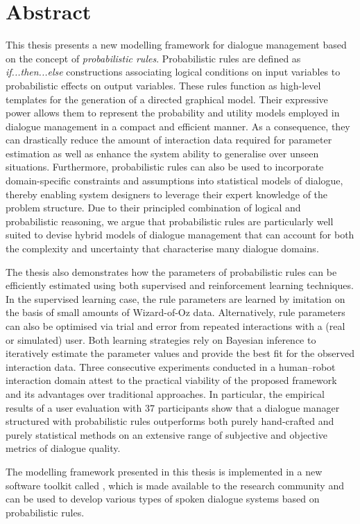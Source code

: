 \chapter*{Abstract}

This thesis presents a new modelling framework for dialogue management based on the concept of \textit{probabilistic rules}.  Probabilistic rules are defined as \textit{if...then...else} constructions associating logical conditions on input variables to probabilistic effects on output variables.  These rules function as high-level templates for the generation of a directed graphical model. Their expressive power allows them to represent the probability and utility models employed in dialogue management in a compact and efficient manner. As a consequence, they can drastically reduce the amount of interaction data required for parameter estimation as well as enhance the system ability to generalise over unseen situations. Furthermore, probabilistic rules can also be used to incorporate domain-specific constraints and assumptions into statistical models of dialogue, thereby enabling system designers to leverage their expert knowledge of the problem structure.  Due to their principled combination of logical and probabilistic reasoning, we argue that probabilistic rules are particularly well suited to devise hybrid models of dialogue management that can account for both the complexity and uncertainty that characterise many dialogue domains.


The thesis also demonstrates how the parameters of probabilistic rules can be efficiently estimated using both supervised and reinforcement learning techniques. In the supervised learning case, the rule parameters are learned by imitation on the basis of small amounts of Wizard-of-Oz data.  Alternatively, rule parameters can also be optimised via trial and error from repeated interactions with a (real or simulated) 
user. Both learning strategies rely on Bayesian inference to iteratively estimate the parameter values and provide the best fit for the observed interaction data. Three consecutive experiments conducted in a human--robot interaction domain attest to the practical viability of the proposed framework and its advantages over traditional approaches.  In particular, the empirical results of a user evaluation with 37 participants show that a dialogue manager structured with probabilistic rules outperforms both purely hand-crafted and purely statistical methods on an extensive range of subjective and objective metrics of dialogue quality.

The modelling framework presented in this thesis is implemented in a new software toolkit called \opendial{}, which is made available to the research community and can be used to develop various types of spoken dialogue systems based on probabilistic rules. 
